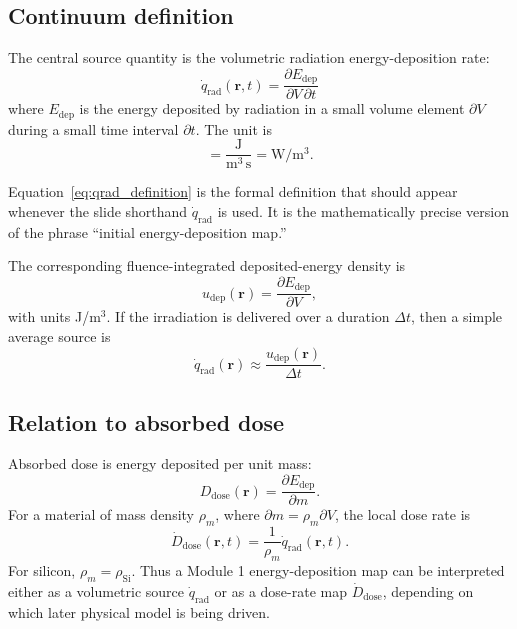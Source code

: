 \documentclass[11pt]{article}
\newcommand{\Edep}{E_{\mathrm{dep}}}
\newcommand{\qrad}{\dot{q}_{\mathrm{rad}}}
\newcommand{\rpos}{\mathbf{r}}
\newcommand{\rhoSi}{\rho_{\mathrm{Si}}}
\begin{document}
\subsection{Continuum definition}

The central source quantity is the volumetric radiation energy-deposition rate:
\begin{equation}
\boxed{
\qrad(\rpos,t)
=
\frac{\partial \Edep}{\partial V\,\partial t}
}
\label{eq:qrad_definition}
\end{equation}
where $\Edep$ is the energy deposited by radiation in a small volume element $\partial V$ during a small time interval $\partial t$. The unit is
\begin{equation}
[\qrad] = \frac{\mathrm{J}}{\mathrm{m}^3\,\mathrm{s}} = \mathrm{W/m^3}.
\end{equation}

Equation~\eqref{eq:qrad_definition} is the formal definition that should appear whenever the slide shorthand $\qrad$ is used. It is the mathematically precise version of the phrase ``initial energy-deposition map.''

The corresponding fluence-integrated deposited-energy density is
\begin{equation}
u_{\mathrm{dep}}(\rpos)
=
\frac{\partial \Edep}{\partial V},
\label{eq:energy_density_definition}
\end{equation}
with units J/m$^3$. If the irradiation is delivered over a duration $\Delta t$, then a simple average source is
\begin{equation}
\qrad(\rpos) \approx \frac{u_{\mathrm{dep}}(\rpos)}{\Delta t}.
\end{equation}

\subsection{Relation to absorbed dose}

Absorbed dose is energy deposited per unit mass:
\begin{equation}
D_{\mathrm{dose}}(\rpos)
=
\frac{\partial \Edep}{\partial m}.
\end{equation}
For a material of mass density $\rho_m$, where $\partial m=\rho_m\partial V$, the local dose rate is
\begin{equation}
\dot{D}_{\mathrm{dose}}(\rpos,t)
=
\frac{1}{\rho_m}\qrad(\rpos,t).
\label{eq:dose_rate_relation}
\end{equation}
For silicon, $\rho_m=\rhoSi$. Thus a Module 1 energy-deposition map can be interpreted either as a volumetric source $\qrad$ or as a dose-rate map $\dot{D}_{\mathrm{dose}}$, depending on which later physical model is being driven.
\end{document}
